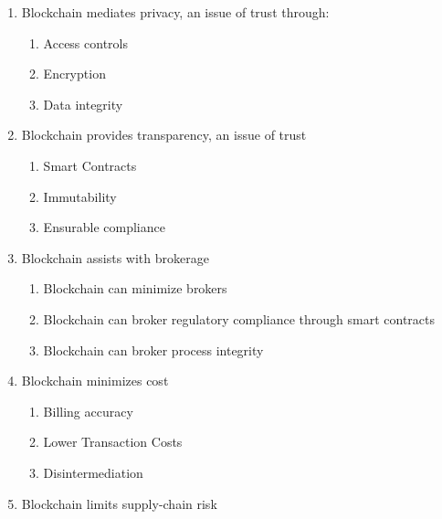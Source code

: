 \documentclass[man]{apa7}
\begin{document}
\begin{enumerate}
\begin{enumerate}
\begin{enumerate}
\item Blockchain mediates privacy, an issue of trust \parencite{sahaiEnablingPrivacyTraceability2020} through:
\begin{enumerate}
\item Access controls \parencite{liuPrivacyProtectionFog2020}
\item Encryption \parencite{chanSimpleScalableBlockchain2021}
\item Data integrity \parencite{elghazouaniEfficientMethodBased2020}
\end{enumerate}
\item Blockchain provides transparency, an issue of trust \parencite{gaurBuildingTransparentSupply2020}
\begin{enumerate}
\item Smart Contracts \parencite{omarEnsuringProtocolCompliance2020}
\item Immutability \parencite{kostalBlockchainEVotingDone2019}
\item Ensurable compliance \parencite{omarEnsuringProtocolCompliance2020}
\end{enumerate}
\item Blockchain assists with brokerage \parencite{piperBlockchainSmartContracts2017} 
\begin{enumerate}
\item Blockchain can minimize brokers \parencite{aryaMiddlemanPanaceaSupply2015}
\item Blockchain can broker regulatory compliance through smart contracts \parencite{saberiBlockchainTechnologyIts2019}
\item Blockchain can broker process integrity \parencite{saberiBlockchainTechnologyIts2019}
\end{enumerate}
\item Blockchain minimizes cost \parencite{xuImpactBlockchainTechnology2020}
\begin{enumerate}
\item Billing accuracy \parencite{groenfeldtIBMMaerskApply2017}
\item Lower Transaction Costs   \parencite{schmidtBlockchainSupplyChain2019}
\item Disintermediation   \parencite{crosbyBlockChainTechnologyBitcoin2016}
\end{enumerate}
\item Blockchain limits supply-chain risk \parencite{gchoiMeanvarianceApproachGlobal2019}
\begin{enumerate}

\end{enumerate}
\end{enumerate}
\end{enumerate}
\end{enumerate}
\end{document}
